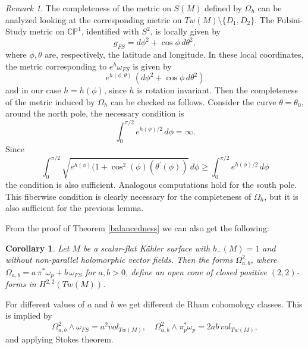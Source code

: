 \documentclass[11pt]{amsart}
\theoremstyle{definition}
\theoremstyle{plain}
\theoremstyle{definition}
\theoremstyle{plain}
\theoremstyle{remark}
\newtheorem{rmk}[Def]{Remark}
\theoremstyle{plain}
\newtheorem{Corollary}[Def]{Corollary}
\newcommand{\numberset}{\mathbb}
\newcommand{\C}{\numberset{C}}
\newcommand{\proj}{\mathbb{P}}
\begin{document}
  
\begin{rmk}  The completeness of the metric on $S(M)$   defined by $\Omega_h$ can be analyzed looking at the corresponding metric on $Tw(M)\setminus \{D_1,D_2\}$. The Fubini-Study metric on $\C\proj^1$, identified with $S^2$, is locally given by
    \[
    g_{FS} =d\phi^2+\cos \phi\, d\theta^2,
    \]
    where $\phi, \theta$ are, respectively, the latitude and longitude.  In these local coordinates, the metric
 corresponding to $e^h\omega_{FS}$ is given by 
    \[
  e^{h(\phi, \theta)} \, \left( d\phi^2+\cos \phi\, d\theta^2 \right)
    \]
    and in our case $h=h(\phi)$, since $h$ is   rotation
invariant.  Then the completeness of the metric induced by $\Omega_h$ can be checked  as follows. Consider  the curve $\theta=\theta_0$,  around the north pole,  the necessary condition is 
    \[
    \int_{0}^{\pi/2} e^{h(\phi)/2} \, d\phi = \infty.
    \]
    Since
    \[
    \int_{0}^{\pi/2} \sqrt{ e^{h(\phi)}(1+\cos^2(\phi) (\theta^{'}(\phi)) }  \, d\phi \geq
    \int_{0}^{\pi/2} e^{h(\phi)/2} \, d\phi 
    \]
    the condition is also sufficient. Analogous computations hold for the south pole. 
    This fiberwise condition is clearly  necessary for the completeness of $\Omega_h$, but it is also sufficient for the previous lemma.
    
\end{rmk}



From the proof of Theorem \ref{balancedness} we  can also  get the following:

\begin{Corollary}
Let $M$ be a scalar-flat K\"ahler surface with $b_-(M)=1$  and without non-parallel holomorphic vector fields. Then the forms $\Omega^2_{a,b}$, where $\Omega_{a,b} = a \, \pi^*\omega_p + b \, \omega_{FS}$ for $a,b>0$, define an open cone of closed positive $(2,2)$-forms in $H^{2,2}(Tw(M))$.
\end{Corollary}

For different values of $a$ and $b$ we  get different de Rham cohomology classes. This is implied by 
\[
\Omega_{a,b} ^2 \wedge \omega_{FS} = a^2 vol_{Tw(M)}, \quad \Omega_{a,b} ^2 \wedge \pi^*_p  \omega_p=  2 a b \, vol_{Tw(M)},
\]
and applying Stokes theorem.
\end{document}
